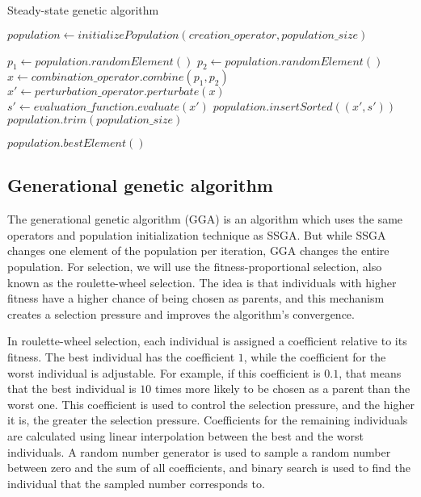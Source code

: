 \begin{algorithm}[!htbp]
    \caption{Steady-state genetic algorithm}
    \label{alg:ssga}

    $population \gets initializePopulation(creation\_operator, population\_size)$\;

     {
        $p_1 \gets population.randomElement()$\;
        $p_2 \gets population.randomElement()$\;
        $x \gets combination\_operator.combine(p_1, p_2)$\;
        $x' \gets perturbation\_operator.perturbate(x)$\;
        $s' \gets evaluation\_function.evaluate(x')$\;
        $population.insertSorted((x', s'))$\;
        $population.trim(population\_size)$\;
    }

    \Return $population.bestElement()$\;
    \end{algorithm}

\subsection{Generational genetic algorithm}
\label{sec:gga}

The generational genetic algorithm (GGA) \citep{gga} is an algorithm which uses the same operators and population initialization technique as SSGA. But while SSGA changes one element of the population per iteration, GGA changes the entire population. For selection, we will use the fitness-proportional selection, also known as the roulette-wheel selection. The idea is that individuals with higher fitness have a higher chance of being chosen as parents, and this mechanism creates a selection pressure and improves the algorithm's convergence.

In roulette-wheel selection, each individual is assigned a coefficient relative to its fitness. The best individual has the coefficient $1$, while the coefficient for the worst individual is adjustable. For example, if this coefficient is $0.1$, that means that the best individual is $10$ times more likely to be chosen as a parent than the worst one. This coefficient is used to control the selection pressure, and the higher it is, the greater the selection pressure. Coefficients for the remaining individuals are calculated using linear interpolation between the best and the worst individuals. A random number generator is used to sample a random number between zero and the sum of all coefficients, and binary search is used to find the individual that the sampled number corresponds to. 

